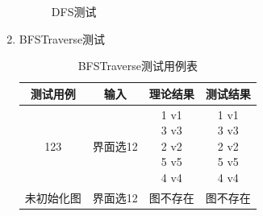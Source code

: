 \documentclass[supercite]{HustGraduPaper}
\theoremstyle{definition}
\begin{document}
\begin{enumerate}
\begin{figure}[htb]
		      \caption{DFS测试}
	      \end{figure}
	      \newpage
	\item BFSTraverse测试
	      \begin{table}[htb]
		      \begin{center}
			      \setlength{\tabcolsep}{2.0mm}
			      \caption{BFSTraverse测试用例表}
			      \label{t12}
			      \begin{tabular}{|c|c|c|c|}
				      \hline
				      测试用例   & 输入     & 理论结果           & 测试结果 \\
				      \hline
				      \hline
				      123        & 界面选12 & \makecell[c]{ 1 v1            \\3 v3\\2 v2\\5 v5\\4 v4} & \makecell[c]{ 1 v1\\3 v3\\2 v2\\5 v5\\4 v4} \\
				      \hline
				      未初始化图 & 界面选12 & 图不存在           & 图不存在 \\
				      \hline
			      \end{tabular}
		      \end{center}
	      \end{table}
	      \begin{figure}[htb]
		      \centering
		      \quad
		      \\

\end{figure}
\end{enumerate}
\end{document}
